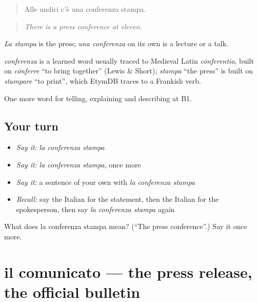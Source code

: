 \begin{quote}
Alle undici c'è una conferenza stampa.
\end{quote}

\begin{quote}
\emph{There is a press conference at eleven.}
\end{quote}

\emph{La stampa} is the press; \emph{una conferenza} on its own is a lecture or a talk.

\begin{cousinweb}
\emph{conferenza} is a learned word usually traced to Medieval Latin \emph{cōnferentia}, built on \emph{cōnferre} \textquotedblleft{}to bring together\textquotedblright{} (Lewis \& Short); \emph{stampa} \textquotedblleft{}the press\textquotedblright{} is built on \emph{stampare} \textquotedblleft{}to print\textquotedblright{}, which EtymDB traces to a Frankish verb.
\end{cousinweb}

\begin{grammarlens}[title={What you've built}]
One more word for telling, explaining and describing at B1.
\end{grammarlens}

\subsection*{Your turn}
\begin{itemize}
\raggedright
  \item \emph{Say it:} \emph{la conferenza stampa}
  \item \emph{Say it:} \emph{la conferenza stampa}, once more
  \item \emph{Say it:} a sentence of your own with \emph{la conferenza stampa}
  \item \emph{Recall:} say the Italian for the statement, then the Italian for the spokesperson, then say \emph{la conferenza stampa} again
\end{itemize}

\begin{tcolorbox}[breakable,colback=teal!4,colframe=teal!35!black,title={Before you move on}]
What does la conferenza stampa mean? (\textquotedblleft{}The press conference\textquotedblright{}.) Say it once more.
\end{tcolorbox}
\section[il comunicato]{il comunicato — the press release, the official bulletin}

